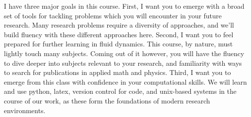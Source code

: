 \documentclass[12pt, preprint]{aastex}
\begin{document}
I have three major goals in this course.  First, I want you to emerge with a broad set of tools for tackling problems which you will encounter in your future research.  Many research problems require a diversity of approaches, and we'll build fluency with these different approaches here.   Second, I want you to feel prepared for further learning in fluid dynamics.  This course, by nature, must lightly touch many subjects.  Coming out of it however, you will have the fluency to dive deeper into subjects relevant to your research, and familiarity with ways to search for publications in applied math and physics. Third, I want you to emerge from this class with confidence in your computational skills.  We will learn and use python, latex, version control for code, and unix-based systems in the course of our work, as these form the foundations of modern research environments.

\newpage
\end{document}
